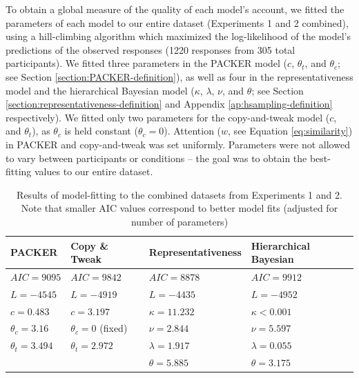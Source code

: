 \documentclass[12pt]{article}
\begin{document}
\begin{flushleft}
To obtain a global measure of the quality of each model's account, we fitted the
parameters of each model to our entire dataset (Experiments 1 and 2 combined),
using a hill-climbing algorithm which maximized the log-likelihood of the
model's predictions of the observed responses (1220 responses from 305 total
participants). We fitted three parameters in the PACKER model ($c$, $\theta_t$,
and $\theta_c$; see Section \ref{section:PACKER-definition}), as well as four in
the representativeness model and the hierarchical Bayesian model ($\kappa$,
$\lambda$, $\nu$, and $\theta$; see Section
\ref{section:representativeness-definition} and Appendix
\ref{ap:hsampling-definition} respectively). We fitted only two parameters for
the copy-and-tweak model ($c$, and $\theta_t$), as $\theta_c$ is held constant
($\theta_c = 0$). Attention ($w$, see Equation \ref{eq:similarity}) in PACKER
and copy-and-tweak was set uniformly. Parameters were not allowed to vary
between participants or conditions -- the goal was to obtain the best-fitting
values to our entire dataset.

\begin{table} \centering
\caption{Results of model-fitting to the combined datasets from Experiments 1
and 2. Note that smaller AIC values correspond to better model fits (adjusted
for number of parameters)}
\label{table:global-model-fits}
\begin{tabular}{ l l l l} \\ \textbf{PACKER} & \textbf{Copy \& Tweak} &
\textbf{Representativeness} & \textbf{Hierarchical Bayesian} \\ \hline $AIC =
  9095$ & $AIC = 9842$ & $AIC = 8878$ &  $AIC =
9912$ \\ $L = -4545$ & $L = -4919$ & $L = -4435$ & $L = -4952$ \\ $c = 0.483$ &
                                                                                $c = 3.197$ & $\kappa = 11.232$ &
$\kappa < 0.001$ \\ $\theta_c = 3.16$ & $\theta_c = 0$ (fixed) & $\nu = 2.844$ & $\nu = 5.597$ \\
$\theta_t = 3.494$ & $\theta_t = 2.972$ & $\lambda = 1.917$& $\lambda
                                                                       = 0.055$
  \\ & &$\theta = 5.885 $& $\theta = 3.175$
\\
\end{tabular}
\end{table}



\end{flushleft}
\end{document}
